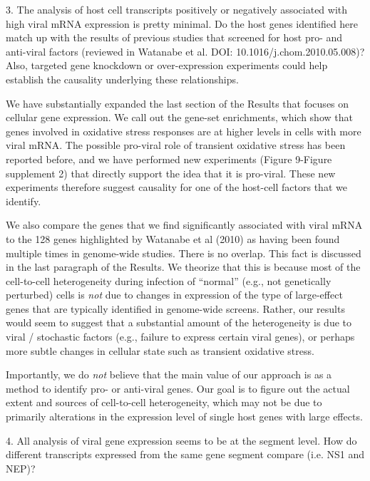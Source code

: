 \documentclass[11pt, oneside]{article}   	%
\begin{document}
3. The analysis of host cell transcripts positively or negatively associated with high viral mRNA expression is pretty minimal. Do the host genes identified here match up with the results of previous studies that screened for host pro- and anti-viral factors (reviewed in Watanabe et al. DOI: 10.1016/j.chom.2010.05.008)? Also, targeted gene knockdown or over-expression experiments could help establish the causality underlying these relationships. 

{\color{black}
We have substantially expanded the last section of the Results that focuses on cellular gene expression.
We call out the gene-set enrichments, which show that genes involved in oxidative stress responses are at higher levels in cells with more viral mRNA.
The possible pro-viral role of transient oxidative stress has been reported before, and we have performed new experiments (Figure 9-Figure supplement 2) that directly support the idea that it is pro-viral.
These new experiments therefore suggest causality for one of the host-cell factors that we identify.

We also compare the genes that we find significantly associated with viral mRNA to the 128 genes highlighted by Watanabe et al (2010) as having been found multiple times in genome-wide studies.
There is no overlap.
This fact is discussed in the last paragraph of the Results.
We theorize that this is because most of the cell-to-cell heterogeneity during infection of ``normal'' (e.g., not genetically perturbed) cells is \emph{not} due to changes in expression of the type of large-effect genes that are typically identified in genome-wide screens.
Rather, our results would seem to suggest that a substantial amount of the heterogeneity is due to viral / stochastic factors (e.g., failure to express certain viral genes), or perhaps more subtle changes in cellular state such as transient oxidative stress.

Importantly, we do \emph{not} believe that the main value of our approach is as a method to identify pro- or anti-viral genes.
Our goal is to figure out the actual extent and sources of cell-to-cell heterogeneity, which may not be due to primarily alterations in the expression level of single host genes with large effects.
}

4. All analysis of viral gene expression seems to be at the segment level. How do different transcripts expressed from the same gene segment compare (i.e. NS1 and NEP)? 
\end{document}
